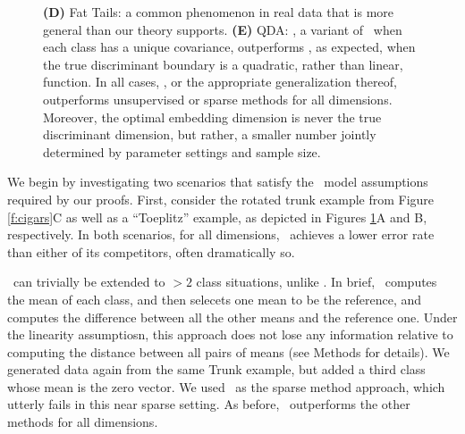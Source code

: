 \documentclass[10pt]{article}
\begin{document}
\begin{figure}
{\textbf{(D)} Fat Tails: a common phenomenon in real data that is more general than our theory supports.
\textbf{(E)} QDA: \Qoq, a variant of \Lol~when each class has a unique covariance, outperforms \Lol, as expected, when the true discriminant boundary is a quadratic, rather than linear, function.
In all  cases, \Lol, or the appropriate generalization thereof, outperforms unsupervised or sparse methods for all dimensions.  Moreover, the optimal embedding dimension is never the true discriminant dimension, but rather, a smaller number jointly determined by parameter settings and sample size.
}
\label{f:properties}
\end{figure}





 We begin by investigating two scenarios that satisfy the \Lda~model assumptions required by our proofs. First, consider  the rotated trunk example from Figure \ref{f:cigars}{\color{magenta}C} as well as a ``Toeplitz'' example, as depicted in Figures \ref{f:properties}{\color{magenta}A} and {\color{magenta}B}, respectively.  In both scenarios, for all dimensions, \Lol~achieves a lower error rate than either of its competitors, often dramatically so.


 \Lol~can trivially be extended to $>2$ class situations, unlike \Road.  In brief, \Lol~computes the mean of each class, and then selecets one mean to be the reference, and computes the difference between all the other means and the reference one.  Under the linearity assumptiosn, this approach does not lose any information relative to computing the distance between all pairs of means  (see Methods for details).  We generated data again from the same Trunk example, but added a third class whose mean is the zero vector.  We used \Lasso~as the sparse method approach, which utterly fails in this near sparse setting.  As before, \Lol~outperforms the other methods for all dimensions. 
\end{document}
